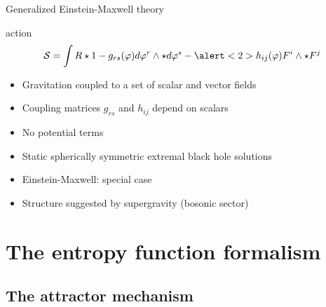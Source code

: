 \documentclass{beamer}
\begin{document}
\begin{frame}{Generalized Einstein-Maxwell theory}

  \begin{block}{action}
    \begin{displaymath}
    \mathcal{S} = \int  R \star 1 - g_{rs}(\varphi) d\varphi^{r} \wedge \star d\varphi^{s} -
    	\alert<2>{h_{ij}(\varphi)} F^{i} \wedge \star F^{j} 
    \end{displaymath}
  \end{block}

  \begin{itemize}
  \item Gravitation coupled to a set of scalar and vector fields
  \pause
  \item Coupling matrices $g_{rs}$ and $h_{ij}$ depend on scalars
  \pause
  \item No potential terms
  \item Static spherically symmetric extremal black hole solutions
  \item Einstein-Maxwell: special case
  \vspace{5mm}
  \item Structure suggested by supergravity (bosonic sector)
  
  \end{itemize}

\end{frame}


\section{The entropy function formalism}

\subsection{The attractor mechanism}
\end{document}
